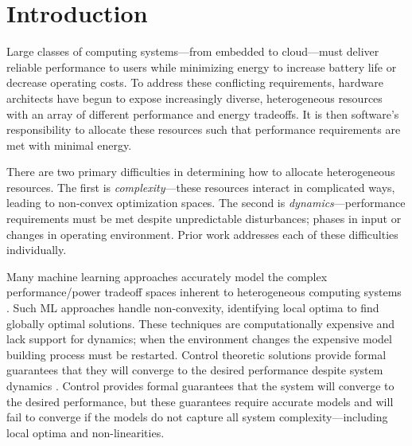 \section{Introduction}
Large classes of computing systems---from embedded to cloud---must
deliver reliable performance to users while minimizing energy to
increase battery life or decrease operating costs.  To address these
conflicting requirements, hardware architects have begun to expose
increasingly diverse, heterogeneous resources with an array of
different performance and energy tradeoffs.  It is then software's
responsibility to allocate these resources such that performance
requirements are met with minimal energy.


There are two primary difficulties in determining how to allocate
heterogeneous resources.  The first is \emph{complexity}---these
resources interact in complicated ways, leading to non-convex
optimization spaces.  The second is \emph{dynamics}---perfor\-mance
requirements must be met despite unpredictable disturbances; \eg{}
phases in input or changes in operating environment.  Prior work
addresses each of these difficulties individually.

Many machine learning approaches accurately model the complex
performance/power tradeoff spaces inherent to heterogeneous computing
systems
\cite{reddiHPCA2013,dubach2010,Bitirgen2008,Ipek,Koala,LEO,Flicker,Ponamarev}.
Such ML approaches handle non-convexity, identifying local optima to
find globally optimal solutions. These techniques are computationally
expensive and lack support for dynamics; \ie{} when the environment
changes the expensive model building process must be restarted.
Control theoretic solutions provide formal guarantees that they will
converge to the desired performance despite system dynamics
\cite{Hellerstein2004a,Chen2011,PTRADE,POET,ControlWare,Agilos,grace2}.
Control provides formal guarantees that the system will converge to
the desired performance, but these guarantees require accurate models
and will fail to converge if the models do not capture all system
complexity---including local optima and non-linearities.


